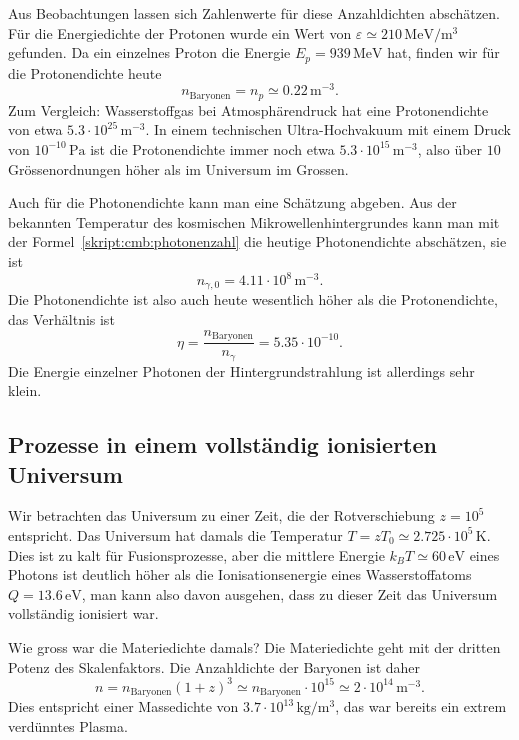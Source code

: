 Aus Beobachtungen lassen sich Zahlenwerte für diese Anzahldichten abschätzen.
Für die Energiedichte der Protonen wurde ein Wert von
$\varepsilon \simeq 210\,\text{MeV}/\text{m}^3$ gefunden.
Da ein einzelnes Proton die Energie $E_p=939\,\text{MeV}$ hat, finden wir
für die Protonendichte heute
\[
n_{\text{Baryonen}}
=
n_p
\simeq
0.22\,\text{m}^{-3}.
\]
Zum Vergleich: Wasserstoffgas bei Atmosphärendruck hat eine Protonendichte
von etwa $5.3\cdot 10^{25}\,\text{m}^{-3}$.
In einem technischen Ultra-Hochvakuum mit einem Druck von
$10^{-10}\,\text{Pa}$ ist die Protonendichte immer noch
etwa $5.3\cdot 10^{15}\,\text{m}^{-3}$, also über $10$ Grössenordnungen
höher als im Universum im Grossen.

Auch für die Photonendichte kann man eine Schätzung abgeben.
Aus der bekannten Temperatur des kosmischen Mikrowellenhintergrundes
kann man mit der Formel~\eqref{skript:cmb:photonenzahl} die heutige
Photonendichte abschätzen, sie ist
\[
n_{\gamma,0}=4.11\cdot 10^8\,\text{m}^{-3}.
\]
Die Photonendichte ist also auch heute wesentlich höher als die 
Protonendichte, das Verhältnis ist
\[
\eta = \frac{n_{\text{Baryonen}}}{n_\gamma} = 5.35\cdot 10^{-10}.
\]
Die Energie einzelner Photonen der Hintergrundstrahlung ist
allerdings sehr klein.

\subsection{Prozesse in einem vollständig ionisierten Universum}
Wir betrachten das Universum zu einer Zeit, die der Rotverschiebung
$z=10^5$ entspricht.
Das Universum hat damals die Temperatur
$T=zT_0 \simeq 2.725\cdot 10^5\,\text{K}$.
Dies ist zu kalt für Fusionsprozesse, aber die mittlere Energie 
$k_BT\simeq 60\,\text{eV}$ eines Photons ist deutlich höher als die
Ionisationsenergie eines Wasserstoffatoms $Q=13.6\,\text{eV}$,
man kann also davon ausgehen,
dass zu dieser Zeit das Universum vollständig ionisiert war.

Wie gross war die Materiedichte damals? 
Die Materiedichte geht mit der dritten Potenz des Skalenfaktors.
Die Anzahldichte der Baryonen ist daher
\[
n = n_{\text{Baryonen}}(1+z)^3 
\simeq
n_{\text{Baryonen}}\cdot 10^{15}
\simeq
2\cdot 10^{14}\,\text{m}^{-3}.
\]
Dies entspricht einer Massedichte von $3.7\cdot 10^{13}\,\text{kg}/\text{m}^3$,
das war bereits ein extrem verdünntes Plasma.

